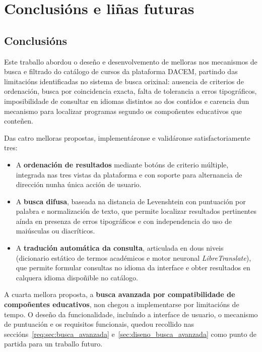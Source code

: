 \documentclass[%
    a4paper,               %
    twoside,               %
    10pt,                  %
]{article}                 %
\begin{document}
\section{Conclusións e liñas futuras}

\subsection{Conclusións}

Este traballo abordou o deseño e desenvolvemento de melloras nos mecanismos de busca e filtrado do catálogo de cursos da plataforma DACEM, partindo das limitacións identificadas no sistema de busca orixinal: ausencia de criterios de ordenación, busca por coincidencia exacta, falta de tolerancia a erros tipográficos, imposibilidade de consultar en idiomas distintos ao dos contidos e carencia dun mecanismo para localizar programas segundo os compoñentes educativos que conteñen.

Das catro melloras propostas, implementáronse e validáronse satisfactoriamente tres:

\begin{itemize}
    \item A \textbf{ordenación de resultados} mediante botóns de criterio múltiple, integrada nas tres vistas da plataforma e con soporte para alternancia de dirección nunha única acción de usuario.
    \item A \textbf{busca difusa}, baseada na distancia de Levenshtein con puntuación por palabra e normalización de texto, que permite localizar resultados pertinentes aínda en presenza de erros tipográficos e con independencia do uso de maiúsculas ou diacríticos.
    \item A \textbf{tradución automática da consulta}, articulada en dous niveis (dicionario estático de termos académicos e motor neuronal \textit{LibreTranslate}), que permite formular consultas no idioma da interface e obter resultados en calquera idioma dispoñible no catálogo.
\end{itemize}

A cuarta mellora proposta, a \textbf{busca avanzada por compatibilidade de compoñentes educativos}, non chegou a implementarse por limitacións de tempo. O deseño da funcionalidade, incluíndo a interface de usuario, o mecanismo de puntuación e os requisitos funcionais, quedou recollido nas seccións~\ref{req:sec:busca_avanzada} e~\ref{sec:diseno_busca_avanzada} como punto de partida para un traballo futuro.
\end{document}
